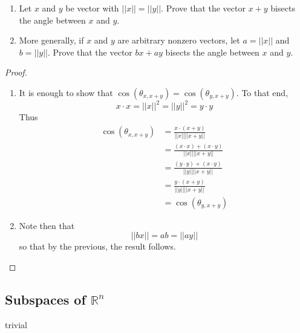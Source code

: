 \begin{exercise} \label{e1.2.20}
    \begin{enumerate}
        \item Let $x$ and $y$ be vector with $\vert\vert x \vert\vert = \vert\vert y \vert\vert$. Prove that the vector $x+y$ bisects the angle between $x$ and $y$.
        
        \item More generally, if $x$ and $y$ are arbitrary nonzero vectors, let $a = \vert\vert x \vert\vert$ and $b=\vert\vert y \vert\vert$. Prove that the vector $bx+ay$ bisects the angle between $x$ and $y$.
    \end{enumerate}
    
    \begin{proof}
        \begin{enumerate}
            \item It is enough to show that $\cos\left( \theta_{x,x+y} \right) = \cos\left( \theta_{y,x+y} \right)$. To that end, 
            $$ x \cdot x = \vert\vert x \vert\vert^2 = \vert\vert y \vert\vert^2 = y \cdot y $$
            Thus 
            \begin{align*} 
                \cos\left( \theta_{x,x+y} \right) &= \frac{x \cdot (x+y)}{\vert\vert x \vert\vert \vert\vert x+y \vert\vert} \\
                &= \frac{(x \cdot x) + (x \cdot y)}{\vert\vert x \vert\vert \vert\vert x+y \vert\vert} \\
                &= \frac{(y \cdot y)+(x \cdot y)}{\vert\vert y \vert\vert \vert\vert x+y \vert\vert} \\
                &= \frac{y \cdot (x+y)}{\vert\vert y \vert\vert \vert\vert x+y \vert\vert} \\
                &=  \cos\left( \theta_{y,x+y} \right) 
            \end{align*}
            
            \item Note then that 
            $$ \vert\vert bx \vert \vert = ab = \vert\vert ay \vert\vert $$
            so that by the previous, the result follows.
        \end{enumerate}
    \end{proof}
\end{exercise} %

\subsection{Subspaces of $\mathbb{R}^n$}
\begin{exercise} \label{e1.3.1}
    trivial
\end{exercise} %

